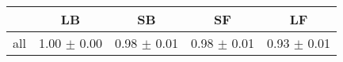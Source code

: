 \begin{tabular}{c c c c c }
\hline
 & LB & SB & SF & LF \\
\hline
all & 1.00 $\pm$ 0.00 & 0.98 $\pm$ 0.01 & 0.98 $\pm$ 0.01 & 0.93 $\pm$ 0.01 \\
\hline
\end{tabular}